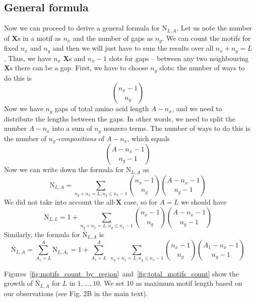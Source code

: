 \documentclass[fleqn, oneside, listof=totoc,%
 bibliography=totoc, paper=A4]{scrartcl}[2007/12/24]
\begin{document}
\subsection{General formula}
Now we can proceed to derive a general formula for $\mathrm{N}_{L, A}$. Let us note the number of $\mathbf{X}$s in a motif
 as $n_x$ and the number of gaps as $n_g$. 
 We can count the motifs for fixed $n_x$ and $n_g$ and then 
 we will just have to sum the results over all $n_x  + n_g = L$. 
 Thus, we have $n_x$ $\mathbf{X}$s and $n_x - 1$ slots for gaps -- 
 between any two neighbouring $\mathbf{X}$s there can be a gap. 
 First, we have to choose $n_g$ slots: the number of ways to do this is 
$$n_x - 1 \choose n_g$$
 Now we have $n_g$ gaps of total amino acid length $A - n_x$, and we need to distribute 
 the lengths between the gaps. In other words, we need to split the number $A - n_x$ 
 into a sum of $n_g$ nonzero terms. The number of ways to do this is the number of $n_g$\textit{-compositions} of $A - n_x$,
 which equals
 $$A - n_x - 1 \choose n_g - 1$$
Now we can write down the formula for $\mathrm{N}_{L, A}$ as 
$$\mathrm{N}_{L,A} = \sum_{n_g + n_x = L, n_g \le n_x - 1} {n_x - 1 \choose n_g} {A - n_x - 1 \choose n_g - 1}$$
We did not take into account the all-$\mathbf{X}$ case, so for $A=L$ we should have
$$\mathrm{N}_{L,L} = 1 + \sum_{n_g + n_x = L, n_g \le n_x - 1} {n_x - 1 \choose n_g} {A - n_x - 1 \choose n_g - 1}$$
Similarly, the formula for $\bar{\mathrm{N}}_{L, A}$ is 
$$\bar{\mathrm{N}}_{L,A} = \sum_{A_1 = L}^A \mathrm{N}_{L,A_1} = 1 + \sum_{A_1 = L}^A \; \sum_{n_g + n_x = L, n_g \le n_x - 1} {n_x - 1 \choose n_g} {A_1 - n_x - 1 \choose n_g - 1}$$

Figures~\ref{fig:motifs_count_by_region}~and~\ref{fig:total_motifs_count} show the growth of $\bar{\mathrm{N}}_{L,A}$ for $L$ in $1, ..., 10$. We set 10 as maximum motif length based on our observations (see Fig. 2B in the main text). 
\end{document}
